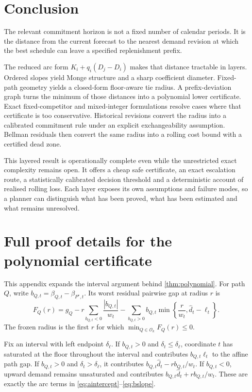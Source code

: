 \documentclass[11pt]{article}
\theoremstyle{definition}
\newcommand{\cO}{\mathcal{O}}
\newcommand{\dhat}{\widehat d}
\newcommand{\ellv}{\ell}
\begin{document}
\section{Conclusion}

The relevant commitment horizon is not a fixed number of calendar periods. It is the distance from the current forecast to the nearest demand revision at which the best schedule can leave a specified replenishment prefix.

The reduced arc form $K_i+q_i(D_j-D_i)$ makes that distance tractable in layers. Ordered slopes yield Monge structure and a sharp coefficient diameter. Fixed-path geometry yields a closed-form floor-aware tie radius. A prefix-deviation graph turns the minimum of those distances into a polynomial lower certificate. Exact fixed-competitor and mixed-integer formulations resolve cases where that certificate is too conservative. Historical revisions convert the radius into a calibrated commitment rule under an explicit exchangeability assumption. Bellman residuals then convert the same radius into a rolling cost bound with a certified dead zone.

This layered result is operationally complete even while the unrestricted exact complexity remains open. It offers a cheap safe certificate, an exact escalation route, a statistically calibrated decision threshold and a deterministic account of realised rolling loss. Each layer exposes its own assumptions and failure modes, so a planner can distinguish what has been proved, what has been estimated and what remains unresolved.

\clearpage
\appendix

\section{Full proof details for the polynomial certificate}

This appendix expands the interval argument behind \cref{thm:polynomial}. For path $Q$, write $b_{Q,t}=\beta_{Q,t}-\beta_{P^\star,t}$. Its worst residual pairwise gap at radius $r$ is
\begin{equation}\label{eq:appendixF}
F_Q(r)=g_Q-
 r\sum_{b_{Q,t}<0}\frac{|b_{Q,t}|}{w_t}
 -\sum_{b_{Q,t}>0}b_{Q,t}\min\left\{\frac r{w_t},\dhat_t-\ellv_t\right\}.
\end{equation}
The frozen radius is the first $r$ for which $\min_{Q\in\cO_k}F_Q(r)\le0$.

Fix an interval with left endpoint $\delta_\ell$. If $b_{Q,t}>0$ and $\delta_t\le\delta_\ell$, coordinate $t$ has saturated at the floor throughout the interval and contributes $b_{Q,t}\ellv_t$ to the affine path gap. If $b_{Q,t}>0$ and $\delta_t>\delta_\ell$, it contributes $b_{Q,t}\dhat_t-rb_{Q,t}/w_t$. If $b_{Q,t}<0$, upward demand remains unsaturated and contributes $b_{Q,t}\dhat_t+r b_{Q,t}/w_t$. These are exactly the arc terms in \eqref{eq:aintercept}--\eqref{eq:bslope}.
\end{document}

